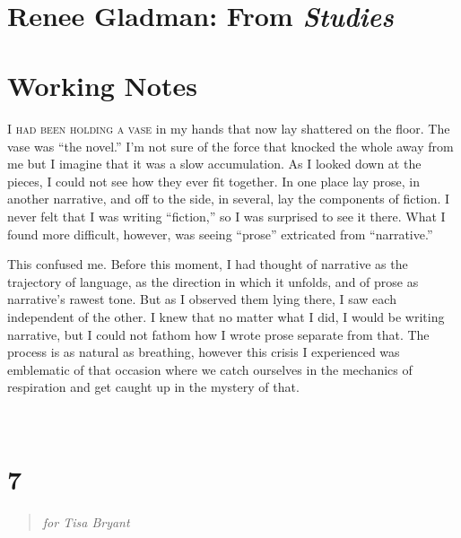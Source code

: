 \documentclass[
]{memoir}
\begin{document}
~

\hypertarget{renee-gladman-from-studies}{%
\section*{\texorpdfstring{Renee Gladman: From
\emph{Studies}}{Renee Gladman: From Studies}}\label{renee-gladman-from-studies}}

\hypertarget{working-notes-3}{%
\section*{Working Notes}\label{working-notes-3}}

\lettrine[lines=3, findent=0em, nindent=0.1em, lhang=0]{I}{ had been holding a vase}
in my hands that now lay shattered on the floor. The vase was ``the
novel.'' I'm not sure of the force that knocked the whole away from me
but I imagine that it was a slow accumulation. As I looked down at the
pieces, I could not see how they ever fit together. In one place lay
prose, in another narrative, and off to the side, in several, lay the
components of fiction. I never felt that I was writing ``fiction,'' so I
was surprised to see it there. What I found more difficult, however, was
seeing ``prose'' extricated from ``narrative.''

This confused me. Before this moment, I had thought of narrative as the
trajectory of language, as the direction in which it unfolds, and of
prose as narrative's rawest tone. But as I observed them lying there, I
saw each independent of the other. I knew that no matter what I did, I
would be writing narrative, but I could not fathom how I wrote prose
separate from that. The process is as natural as breathing, however this
crisis I experienced was emblematic of that occasion where we catch
ourselves in the mechanics of respiration and get caught up in the
mystery of that.

~

\hypertarget{section-15}{%
\section*{7}\label{section-15}}

\begin{verse}
\emph{for Tisa Bryant}\\
\end{verse}
\end{document}
